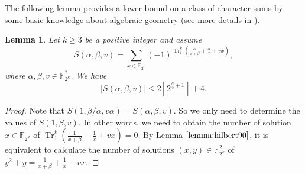 \documentclass[preprint,10pt]{elsarticle}
\newcommand{\F}{\mathbb{F}}
\newcommand{\0}{\textbf{0}}
\newcommand{\1}{\textbf{1}}
\newcommand{\TRACE}{\operatorname{Tr}_1^k}
\theoremstyle{plain}
\newtheorem{lemma}{Lemma}
\begin{document}
The following lemma provides a lower bound on a class of character sums by some basic knowledge about algebraic geometry (see more details in \cite{Stichtenoth2008book_algebraicfunctionfieldsandcodes}).
    \begin{lemma}\label{lemma:charactersums}
        Let $k\ge 3$ be a positive integer and assume
        \[S(\alpha,\beta,v)=\sum_{x\in\F_{2^k}}(-1)^{\TRACE\left( \frac{\alpha}{x+\beta}+\frac{\alpha}{x}+vx \right)},\]
        where $\alpha,\beta,v\in\F_{2^k}^*$.
        We have
        \[\left\lvert S(\alpha,\beta,v)\right\rvert\le 2\left\lfloor 2^{\frac{k}{2}+1}\right\rfloor+4 .\]
    \end{lemma}
    \begin{proof}
        Note that $S(1,\beta/\alpha,v\alpha)=S(\alpha,\beta,v)$.
        So we only need to determine the values of $S(1,\beta,v)$.
        In other words, we need to obtain the number of solution $x\in\F_{2^k}$ of $\TRACE\left( \frac{1}{x+\beta}+\frac{1}{x}+vx \right)=0$.
        By Lemma $\ref{lemma:hilbert90}$, it is equivalent to calculate the number of solutions $(x,y)\in\F_{2^k}^2$ of $y^2+y=\frac{1}{x+\beta}+\frac{1}{x}+vx$.


\end{proof}
\end{document}
